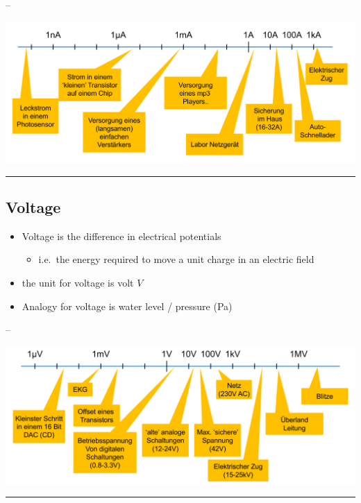 \documentclass[a4paper]{article}
\providecommand{\tightlist}{%
  \setlength{\itemsep}{0pt}\setlength{\parskip}{0pt}}
\begin{document}
\begin{multicols*}{3}
--

\includegraphics{../assets/images/2022-02-06-20-42-18.png}

\begin{center}\rule{0.5\linewidth}{0.5pt}\end{center}

\hypertarget{voltage}{%
\subsection{Voltage}\label{voltage}}

\begin{itemize}
\tightlist
\item
  Voltage is the difference in electrical potentials

  \begin{itemize}
  \tightlist
  \item
    i.e.~the energy required to move a unit charge in an electric field
  \end{itemize}
\item
  the unit for voltage is volt \(V\)
\item
  Analogy for voltage is water level / pressure (Pa)
\end{itemize}

--

\includegraphics{../assets/images/2022-02-06-20-46-22.png}

\begin{center}\rule{0.5\linewidth}{0.5pt}\end{center}


\end{multicols*}
\end{document}
